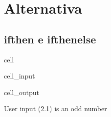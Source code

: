 \documentclass[letterpaper,10pt,english]{jupyterBook}
\begin{document}
\section{Alternativa}
\label{\detokenize{ch/programming/flow_control:alternativa}}

\subsection{if\sphinxhyphen{}then e if\sphinxhyphen{}then\sphinxhyphen{}else}
\label{\detokenize{ch/programming/flow_control:if-then-e-if-then-else}}
\begin{sphinxuseclass}{cell}\begin{sphinxVerbatimInput}

\begin{sphinxuseclass}{cell_input}
\begin{sphinxVerbatim}[commandchars=\\\{\}]

  

  
          
      

\end{sphinxVerbatim}

\end{sphinxuseclass}\end{sphinxVerbatimInput}
\begin{sphinxVerbatimOutput}

\begin{sphinxuseclass}{cell_output}
\begin{sphinxVerbatim}[commandchars=\\\{\}]
User input (2.1) is an odd number
\end{sphinxVerbatim}

\end{sphinxuseclass}\end{sphinxVerbatimOutput}

\end{sphinxuseclass}
\end{document}
